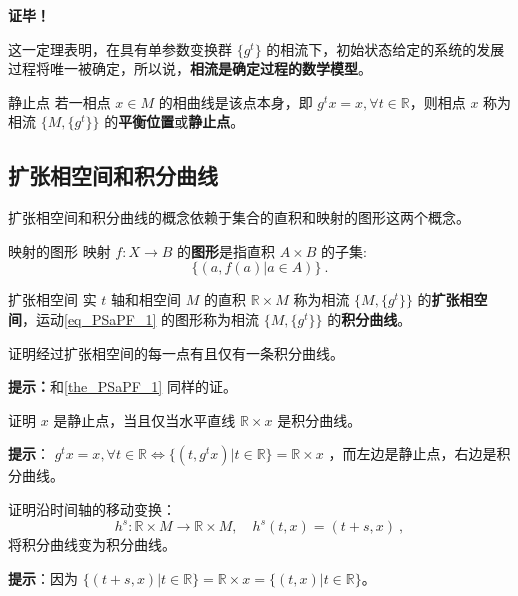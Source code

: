 \textbf{证毕！}

这一定理表明，在具有单参数变换群 $\{g^t\}$ 的相流下，初始状态给定的系统的发展过程将唯一被确定，所以说，\textbf{相流是确定过程的数学模型}。
\begin{definition}{静止点}
若一相点 $x\in M$ 的相曲线是该点本身，即 $g^t x=x,\forall t\in\mathbb R$，则相点 $x$ 称为相流 $\{M,\{g^t\}\}$ 的\textbf{平衡位置}或\textbf{静止点}。
\end{definition}
\subsection{扩张相空间和积分曲线}\label{sub_PSaPF_1}
扩张相空间和积分曲线的概念依赖于集合的直积和映射的图形这两个概念。
\begin{definition}{映射的图形}
映射 $f:X\rightarrow B$ 的\textbf{图形}是指直积 $A\times B$ 的子集:
\begin{equation}
\{(a,f(a)|a\in A)\}~.
\end{equation}
\end{definition}
\begin{definition}{扩张相空间}\label{def_PSaPF_2}
实 $t$ 轴和相空间 $M$ 的直积 $\mathbb R\times M$ 称为相流 $\{M,\{g^t\}\}$ 的\textbf{扩张相空间}，运动\autoref{eq_PSaPF_1} 的图形称为相流 $\{M,\{g^t\}\}$ 的\textbf{积分曲线}。
\end{definition}
\begin{exercise}{}
证明经过扩张相空间的每一点有且仅有一条积分曲线。
\end{exercise}
\textbf{提示：}和\autoref{the_PSaPF_1} 同样的证。

\begin{exercise}{}
证明 $x$ 是静止点，当且仅当水平直线 $\mathbb R\times x$ 是积分曲线。
\end{exercise}
\textbf{提示}： $g^t x=x,\forall t\in\mathbb R\Leftrightarrow\{(t,g^t x)|t\in \mathbb R\}=\mathbb R\times x$ ，而左边是静止点，右边是积分曲线。
\begin{exercise}{}
证明沿时间轴的移动变换：
\begin{equation}
h^s:\mathbb R\times M\rightarrow\mathbb R\times M,\quad h^s(t,x)=(t+s,x)~,
\end{equation}
将积分曲线变为积分曲线。
\end{exercise}
\textbf{提示}：因为 $\{(t+s,x)|t\in\mathbb R\}=\mathbb R\times x=\{(t,x)|t\in\mathbb R\}$。
